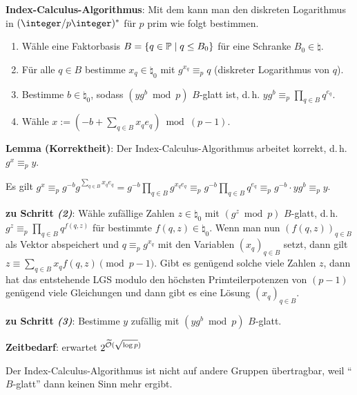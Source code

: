 \textbf{Index-Calculus-Algorithmus}:
Mit dem  kann man den diskreten Logarithmus
in $(\ZpZ)^\ast$ für $p$ prim wie folgt bestimmen.
\begin{enumerate}
    \item
    Wähle eine Faktorbasis $B = \{q \in \mathbb{P} \;|\; q \le B_0\}$ für eine Schranke
    $B_0 \in \natural$.

    \item
    Für alle $q \in B$ bestimme $x_q \in \natural_0$ mit $g^{x_q} \equiv_p q$
    (diskreter Logarithmus von $q$).

    \item
    Bestimme $b \in \natural_0$, sodass $(yg^b \bmod p)$ $B$-glatt ist,
    d.\,h. $yg^b \equiv_p \prod_{q \in B} q^{e_q}$.

    \item
    Wähle $x := (-b + \sum_{q \in B} x_q e_q) \bmod (p-1)$.
\end{enumerate}

\textbf{Lemma (Korrektheit)}:
Der Index-Calculus-Algorithmus arbeitet korrekt, d.\,h. $g^x \equiv_p y$.

\begin{Beweis}
    Es gilt $g^x \equiv_p g^{-b} g^{\sum_{q \in B} x_q e_q}
    = g^{-b} \prod_{q \in B} g^{x_q e_q}
    \equiv_p g^{-b} \prod_{q \in B} q^{e_q}
    \equiv_p g^{-b} \cdot yg^b \equiv_p y$.
\end{Beweis}

\linie

\textbf{zu Schritt \emph{(2)}}:
Wähle zufällige Zahlen $z \in \natural_0$ mit $(g^z \bmod p)$ $B$-glatt,
d.\,h. $g^z \equiv_p \prod_{q \in B} q^{f(q,z)}$ für bestimmte $f(q,z) \in \natural_0$.
Wenn man nun $(f(q,z))_{q \in B}$ als Vektor abspeichert
und $q \equiv_p g^{x_q}$ mit den Variablen $(x_q)_{q \in B}$ setzt,
dann gilt $z \equiv \sum_{q \in B} x_q f(q, z) \pmod{p - 1}$.
Gibt es genügend solche viele Zahlen $z$, dann hat das entstehende LGS modulo den höchsten
Primteilerpotenzen von $(p-1)$ genügend viele Gleichungen und dann gibt es eine Lösung
$(x_q)_{q \in B}$.

\textbf{zu Schritt \emph{(3)}}:
Bestimme $y$ zufällig mit $(yg^b \bmod p)$ $B$-glatt.

\linie

\textbf{Zeitbedarf}:
erwartet $2^{\widetilde{\mathcal{O}}(\sqrt{\log p})}$

\linie

Der Index-Calculus-Algorithmus ist nicht auf andere Gruppen übertragbar, weil
"`$B$-glatt"' dann keinen Sinn mehr ergibt.

\pagebreak
